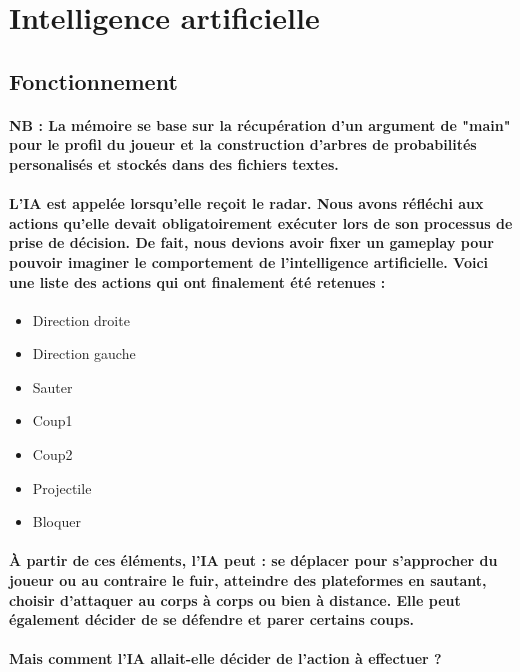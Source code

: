 \newpage
\section{Intelligence artificielle}
\subsection{Fonctionnement}
\paragraph{NB : La mémoire se base sur la récupération d'un argument de "main" pour le profil du joueur et la construction d'arbres de probabilités personalisés et stockés dans des fichiers textes.}

\paragraph{L'IA est appelée lorsqu'elle reçoit le radar. Nous avons réfléchi aux actions qu'elle devait obligatoirement exécuter lors de son processus de prise de décision. De fait, nous devions avoir fixer un gameplay pour pouvoir imaginer le comportement de l'intelligence artificielle. Voici une liste des actions qui ont finalement été retenues :}

\begin{itemize}
	\item Direction droite
	\item Direction gauche
	\item Sauter
	\item Coup1
	\item Coup2
	\item Projectile
	\item Bloquer
\end{itemize}

\vspace{1cm}

\paragraph{\`A partir de ces éléments, l'IA peut : se déplacer pour s'approcher du joueur ou au contraire le fuir, atteindre des plateformes en sautant, choisir d'attaquer au corps à corps ou bien à distance. Elle peut également décider de se défendre et parer certains coups.}

\paragraph{\textbf{Mais comment l'IA allait-elle décider de l'action à effectuer ?}}

